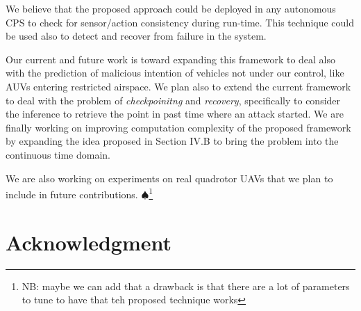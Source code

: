 \documentclass[letterpaper, 10 pt, conference]{ieeeconf}  %
\newcommand\NB[1]{$\spadesuit$\footnote{NB: #1}}
\begin{document}
We believe that the proposed approach could be deployed in any autonomous CPS to check for sensor/action consistency during run-time. This technique could be used also to detect and recover from failure in the system.

Our current and future work is toward expanding this framework to deal also with the prediction of malicious intention of vehicles not under our control, like AUVs entering restricted airspace. We plan also to extend the current framework to deal with the problem of {\em checkpoinitng} and {\em recovery}, specifically to consider the inference to retrieve the point in past time where an attack started.
We are finally working on improving computation complexity of the proposed framework by expanding the idea proposed in Section IV.B to bring the problem into the continuous time domain.

We are also working on experiments on real quadrotor UAVs that we plan to include in future contributions.
\NB{maybe we can add that a drawback is that there are a lot of parameters to tune to have that teh proposed technique works}


%
%
\section*{Acknowledgment}


%
%
%


\end{document}
